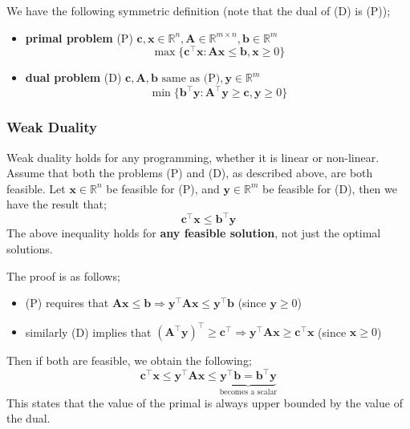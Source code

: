 \documentclass[a4paper, 12pt]{article}
\newcommand{\mat}[1]{\boldsymbol{#1}}
\renewcommand{\vec}[1]{\boldsymbol{#1}}
\begin{document}
                We have the following symmetric definition (note that the dual of (D) is (P));
                \begin{itemize}
                    \itemsep0em
                    \item \textbf{primal problem} (P) \hfill $\vec{c}, \vec{x} \in \mathbb{R}^n, \mat{A} \in \mathbb{R}^{m \times n}, \vec{b} \in \mathbb{R}^m$
                        $$\max\{ \vec{c}^\top\vec{x} : \mat{A}\vec{x} \leq \vec{b}, \vec{x} \geq 0 \}$$
                    \item \textbf{dual problem} (D) \hfill $\vec{c}, \mat{A}, \vec{b} \text{ same as (P)}, \vec{y} \in \mathbb{R}^m$
                        $$\min\{ \vec{b}^\top\vec{y} : \mat{A}^\top\vec{y} \geq \vec{c}, \vec{y} \geq 0 \}$$
                \end{itemize}
            \subsubsection*{Weak Duality}
                Weak duality holds for any programming, whether it is linear or non-linear.
                Assume that both the problems (P) and (D), as described above, are both feasible.
                Let $\vec{x} \in \mathbb{R}^n$ be feasible for (P), and $\vec{y} \in \mathbb{R}^m$ be feasible for (D), then we have the result that;
                $$\vec{c}^\top\vec{x} \leq \vec{b}^\top\vec{y}$$
                The above inequality holds for \textbf{any feasible solution}, not just the optimal solutions.
                \medskip

                The proof is as follows;
                \begin{itemize}
                    \itemsep0em
                    \item (P) requires that $\mat{A}\vec{x} \leq \vec{b} \Rightarrow \vec{y}^\top\mat{A}\vec{x} \leq \vec{y}^\top\vec{b}$ (since $\vec{y} \geq 0$)
                    \item similarly (D) implies that $\left(\mat{A}^\top \vec{y}\right)^\top \geq \vec{c}^\top \Rightarrow \vec{y}^\top\mat{A}\vec{x} \geq \vec{c}^\top\vec{x}$ (since $\vec{x} \geq 0$)
                \end{itemize}
                Then if both are feasible, we obtain the following;
                $$\vec{c}^\top\vec{x} \leq \vec{y}^\top\mat{A}\vec{x} \leq \underbrace{\vec{y}^\top\vec{b} = \vec{b}^\top\vec{y}}_\text{becomes a scalar}$$
                This states that the value of the primal is always upper bounded by the value of the dual.
\end{document}
